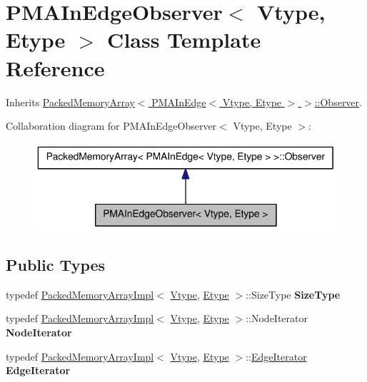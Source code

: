 \hypertarget{class_p_m_a_in_edge_observer}{
\section{PMAInEdgeObserver$<$ Vtype, Etype $>$ Class Template Reference}
\label{class_p_m_a_in_edge_observer}
}


Inherits \hyperlink{class_packed_memory_array_1_1_observer}{PackedMemoryArray$<$ PMAInEdge$<$ Vtype, Etype $>$ $>$::Observer}.



Collaboration diagram for PMAInEdgeObserver$<$ Vtype, Etype $>$:\nopagebreak
\begin{figure}[H]
\begin{center}
\leavevmode
\includegraphics[width=342pt]{class_p_m_a_in_edge_observer__coll__graph}
\end{center}
\end{figure}
\subsection*{Public Types}
\begin{DoxyCompactItemize}
\item 
\hypertarget{class_p_m_a_in_edge_observer_a4801302502631f8823b057ad4a2f176a}{
typedef \hyperlink{class_packed_memory_array_impl}{PackedMemoryArrayImpl}$<$ \hyperlink{class_vtype}{Vtype}, \hyperlink{class_etype}{Etype} $>$::SizeType {\bfseries SizeType}}
\label{class_p_m_a_in_edge_observer_a4801302502631f8823b057ad4a2f176a}

\item 
\hypertarget{class_p_m_a_in_edge_observer_a1641a90c68e1d1e8f43f4313369888c4}{
typedef \hyperlink{class_packed_memory_array_impl}{PackedMemoryArrayImpl}$<$ \hyperlink{class_vtype}{Vtype}, \hyperlink{class_etype}{Etype} $>$::NodeIterator {\bfseries NodeIterator}}
\label{class_p_m_a_in_edge_observer_a1641a90c68e1d1e8f43f4313369888c4}

\item 
\hypertarget{class_p_m_a_in_edge_observer_a80ecfd5d60404110947dd8728b317a0c}{
typedef \hyperlink{class_packed_memory_array_impl}{PackedMemoryArrayImpl}$<$ \hyperlink{class_vtype}{Vtype}, \hyperlink{class_etype}{Etype} $>$::\hyperlink{class_packed_memory_array_1_1_iterator}{EdgeIterator} {\bfseries EdgeIterator}}
\label{class_p_m_a_in_edge_observer_a80ecfd5d60404110947dd8728b317a0c}

\end{DoxyCompactItemize}
